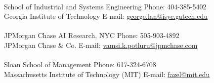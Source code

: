 \documentclass[11pt]{article}
\begin{document}
\\
School of Industrial and Systems Engineering \hfill Phone: 404-385-5402\\
Georgia Institute of Technology \hfill E-mail: \href{mailto:george.lan@isye.gatech.edu}{george.lan@isye.gatech.edu} \\[3ex]

\\
JPMorgan Chase AI Research, NYC  \hfill Phone: 505-903-4892\\
JPMorgan Chase \& Co. \hfill E-mail: \href{mailto:vamsi.k.potluru@jpmchase.com}{vamsi.k.potluru@jpmchase.com} \\[3ex]

\\
Sloan School of Management \hfill Phone: 617-324-6708\\
Massachusetts Institute of Technology (MIT) \hfill E-mail: \href{mailto:fazel@mit.edu}{fazel@mit.edu}
\end{document}
